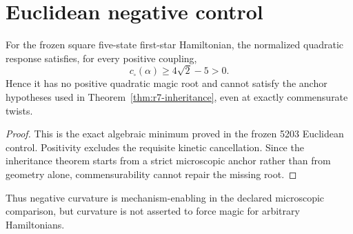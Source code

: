 \section{Euclidean negative control}
\label{sec:r7-euclidean}

\begin{theorem}
\label{thm:r7-euclidean}
For the frozen square five-state first-star Hamiltonian, the normalized
quadratic response satisfies, for every positive coupling,
\begin{equation}
 c_\square(\alpha)\ge4\sqrt2-5>0.
\end{equation}
Hence it has no positive quadratic magic root and cannot satisfy the anchor
hypotheses used in Theorem~\ref{thm:r7-inheritance}, even at exactly
commensurate twists.
\end{theorem}

\begin{proof}
This is the exact algebraic minimum proved in the frozen 5203 Euclidean
control.  Positivity excludes the requisite kinetic cancellation.  Since the
inheritance theorem starts from a strict microscopic anchor rather than from
geometry alone, commensurability cannot repair the missing root.
\end{proof}

Thus negative curvature is mechanism-enabling in the declared microscopic
comparison, but curvature is not asserted to force magic for arbitrary
Hamiltonians.

